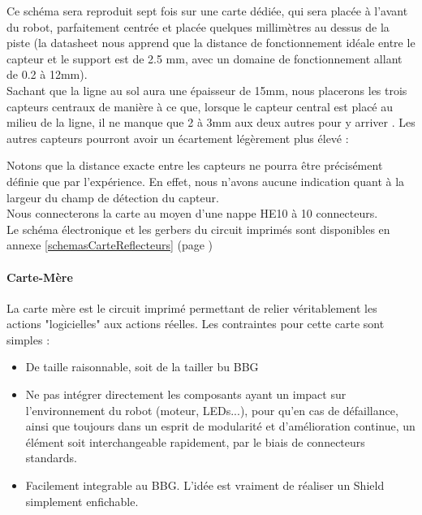 			Ce schéma sera reproduit sept fois sur une carte dédiée, qui sera placée à l'avant du robot, parfaitement centrée et placée quelques millimètres au dessus de la piste (la datasheet nous apprend que la distance de fonctionnement idéale entre le capteur et le support est de 2.5 mm, avec un domaine de fonctionnement allant de 0.2 à 12mm).\\
			
			Sachant que la ligne au sol aura une épaisseur de 15mm, nous placerons les trois capteurs centraux de manière à ce que, lorsque le capteur central est placé au milieu de la ligne, il ne manque que 2 à 3mm aux deux autres pour y arriver . Les autres capteurs pourront avoir un écartement légèrement plus élevé :


			Notons que la distance exacte entre les capteurs ne pourra être précisément définie que par l'expérience. En effet, nous n'avons aucune indication quant à la largeur du champ de détection du capteur.\\

			Nous connecterons la carte au moyen d'une nappe HE10 à 10 connecteurs.\\

			Le schéma électronique et les gerbers du circuit imprimés sont disponibles en annexe \ref{schemasCarteReflecteurs} (page \pageref{schemasCarteReflecteurs})

		\paragraph{Carte-Mère}\label{carteMere}

			La carte mère est le circuit imprimé permettant de relier véritablement les actions "logicielles" aux actions réelles. Les contraintes pour cette carte sont simples :
			\begin{itemize}
				\item De taille raisonnable, soit de la tailler bu BBG
				\item Ne pas intégrer directement les composants ayant un impact sur l'environnement du robot (moteur, LEDs...), pour qu'en cas de défaillance, ainsi que toujours dans un esprit de modularité et d'amélioration continue, un élément soit interchangeable rapidement, par le biais de connecteurs standards.
				\item Facilement integrable au BBG. L'idée est vraiment de réaliser un Shield simplement enfichable.
			\end{itemize}
			

